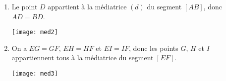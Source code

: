 \begin{myexs}
	\begin{multicols}{2}
		
		\begin{enumerate}
			
%				
%				
			\item  Le point $D$ appartient à la médiatrice $(d)$ du segment $[AB]$, donc $AD=BD$.
			\vspace*{0.5cm}
			\begin{center}
				\texttt{[image: med2]}
			\end{center}
			
			
			\item On a $EG=GF$, $EH=HF$ et $EI=IF$, donc les points $G$, $H$ et $I$ appartiennent tous à la médiatrice du segment $[EF]$.
			
			\begin{center}
				\texttt{[image: med3]}
			\end{center}
			
		\end{enumerate}
	\end{multicols}
	
	
	
\end{myexs}

%	
%		
